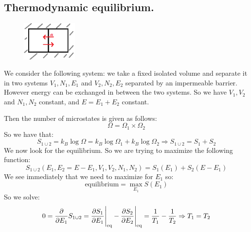 \documentclass[10pt,a4paper]{book}
\begin{document}
\subsection{Thermodynamic equilibrium.}
\begin{figure}
    \includegraphics[width=0.25\textwidth]{graphs/thermo_eq}
\end{figure}
We consider the following system: we take a fixed isolated volume and separate it in two systems $V_1, N_1, E_1$ and $V_2, N_2, E_2$ separated by an impermeable barrier. However energy can be exchanged in between the two systems. So we have $V_1, V_2$ and $N_1, N_2$ constant, and $E = E_1 + E_2$ constant.

Then the number of microstates is given as follows:
\[
\Omega = \Omega_1 \times \Omega_2
\]
So we have that:
\[
S_{1 \cup 2} = k_B \log \Omega = k_B \log\Omega_1 + k_B \log \Omega_2 \Rightarrow S_{1 \cup 2} = S_1 + S_2
\]
We now look for the equilibrium. So we are trying to maximize the following function:
\[
S_{1 \cup 2} (E_1, E_2 = E - E_1, V_1, V_2, N_1, N_2) = S_1(E_1) + S_2(E - E_1)
\]
We see immediately that we need to maximize for $E_1$ so:
\[
\text{equilibrium} = \max_{E_1} S(E_1)
\]
So we solve:
\[
0 = \pdv{}{E_1} S_{1 \cup 2} = \pdv{S_1}{E_1}\Bigg|_{\text{eq}} - \pdv{S_2}{E_2}\Bigg|_{\text{eq}} = \frac{1}{T_1} - \frac{1}{T_2} \Rightarrow T_1 = T_2
\]
\end{document}
